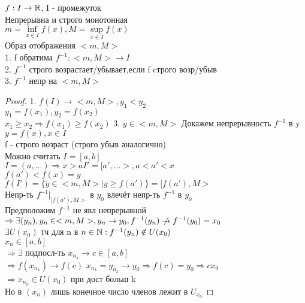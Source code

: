 \begin{theorem}
	$ f : I \rightarrow \mathbb{R} $, I - промежуток \\
	Непрерывна и строго монотонная \\
	$ m = \inf\limits_{x \in I} f(x) , M =  \sup\limits_{x \in I} f(x) $\\
	Образ отображения $ <m, M> $ \\ 
	1. f обратима $ f^{-1} : <m, M> \rightarrow I $ \\
	2. $ f^{-1} $ строго возрастает/убывает,если f cтрого возр/убыв \\
	3. $ f^{-1} $ непр на $ <m, M> $\\
	\begin{proof}
		1. $ f(I) \rightarrow <m, M>, y_1 < y_2 $ \\
		$ y_1 = f ( x_1 ) , y_2 = f(x_2) $ \\
		$ x_1 \geq x_2 \Rightarrow f(x_1) \geq f(x_2) $ %
		3. $ y \in <m, M> $ Докажем непрерывность $ f^{-1} $ в y \\
		$ y = f(x), x \in I $ \\
		f - строго возраст (строго убыв аналогично)\\
		Можно считать $ I = [a, b] $ \\
		$ I = (a, ...) \Rightarrow x > a I' = [a', ...>, a < a' < x $ \\
		$f(a') < f(x) = y $ \\
		$ f(I') = \{\tilde{y} \in <m, M> | y \geq f(a') \} = [f(a'), M> $ \\
		Непр-ть $ f^{-1} |_{[f(a'), M> } $ в $y_0 $  влечёт непр-ть $ f^{-1} $ в $ y_0 $ \\
		Предположим $f^{-1} $ не явл непрерывной \\
		$  \Rightarrow \exists (y_n) , y_n \in <m, M>, y_n \rightarrow y_0, f^{-1} (y_n) \centernot\rightarrow f^{-1} (y_0) = x_0 $ \\
		$ \exists U(x_0) $ тч для n в $ n \in \mathbb{N} : f^{-1} (y_n) \notin U(x_0) $\\
		$ x_n \in [a, b] $ \\
		$ \Rightarrow \exists $ подпосл-ть $ x_{n_k} \rightarrow c \in [a,b] $ \\
		$ \Rightarrow f(x_{n_k}) \rightarrow f(c)   $
		$ x_{n_k} = y_{n_k} \rightarrow y_0  \Rightarrow f(c) = y_0 \Rightarrow c x_0 $\\
		$ \Rightarrow x_{n_k} \in U(x_0) $ при дост больш k \\
		Но в $( x_n )$ лишь конечное число членов лежит в $ U_{x_0} $ 
	\end{proof}
\end{theorem}
